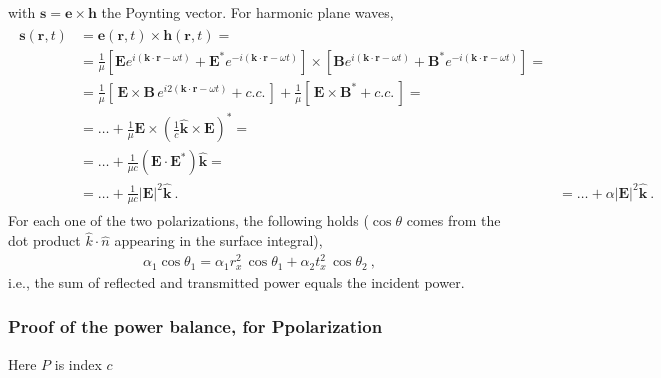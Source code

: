 \documentclass[letterpaper,10pt,english]{jupyterBook}
\begin{document}
\sphinxAtStartPar
with \(\mathbf{s} = \mathbf{e} \times \mathbf{h}\) the Poynting vector. For harmonic plane waves,
\begin{equation*}
\begin{split}\begin{aligned}
  \mathbf{s}(\mathbf{r},t)
  & = \mathbf{e}(\mathbf{r},t) \times \mathbf{h}(\mathbf{r},t) = \\
  & = \frac{1}{\mu} \left[ \mathbf{E} e^{i(\mathbf{k} \cdot \mathbf{r} - \omega t)} + \mathbf{E}^* e^{-i(\mathbf{k} \cdot \mathbf{r} - \omega t)} \right] \times \left[ \mathbf{B} e^{i(\mathbf{k} \cdot \mathbf{r} - \omega t)} + \mathbf{B}^* e^{-i(\mathbf{k} \cdot \mathbf{r} - \omega t)}  \right] = \\
  & = \frac{1}{\mu} \left[ \, \mathbf{E} \times \mathbf{B} \, e^{i 2(\mathbf{k} \cdot \mathbf{r} - \omega t)} + c.c. \, \right] + \frac{1}{\mu} \left[ \, \mathbf{E} \times \mathbf{B}^* + c.c. \, \right] = \\
  & = \dots + \frac{1}{\mu} \mathbf{E} \times \left( \frac{1}{c} \hat{\mathbf{k}} \times \mathbf{E} \right)^* = \\
  & = \dots + \frac{1}{\mu c} \left( \mathbf{E} \cdot \mathbf{E}^* \right) \hat{\mathbf{k}} = \\
  & = \dots + \frac{1}{\mu c} | \mathbf{E} |^2 \hat{\mathbf{k}} \ .
  & = \dots + \alpha | \mathbf{E} |^2 \hat{\mathbf{k}} \ .
\end{aligned}\end{split}
\end{equation*}
\sphinxAtStartPar
For each one of the two polarizations, the following holds (\(\cos \theta\) comes from the dot product \(\hat{k} \cdot \hat{n}\) appearing in the surface integral),
\begin{equation*}
\begin{split}\alpha_1 \cos \theta_1 = \alpha_1 r_x^2 \, \cos \theta_1 + \alpha_2 t_x^2 \, \cos \theta_2 \ ,\end{split}
\end{equation*}
\sphinxAtStartPar
i.e., the sum of reflected and transmitted power equals the incident power.
\subsubsection*{Proof of the power balance, for P\sphinxhyphen{}polarization}

\sphinxAtStartPar
{} Here \(P\) is index \(c\)
\end{document}
